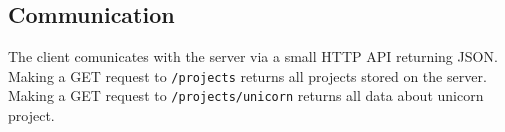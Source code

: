 \subsection{Communication}
\label{interaction}

The client comunicates with the server via a small HTTP API returning JSON.
Making a GET request to \texttt{/projects} returns all projects stored on the server.
Making a GET request to \texttt{/projects/unicorn} returns all data about unicorn project.
